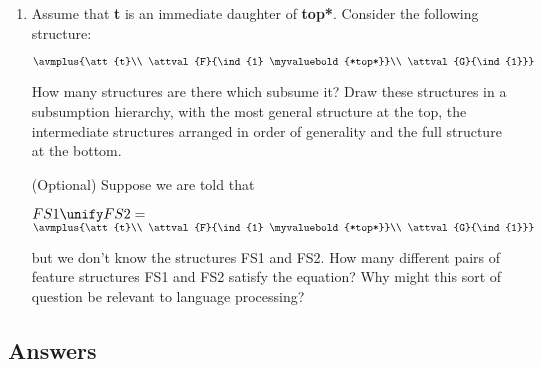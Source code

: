 \documentclass[12pt]{report}
\begin{document}
\begin{enumerate}
\item
Assume that {\bf t} is an immediate daughter of {\bf *top*}.
Consider the following structure:
\begin{center}
{\tiny $\avmplus{\att{t}\\
             \attval{F}{\ind{1} \myvaluebold{*top*}}\\
             \attval{G}{\ind{1}}}$}
\end{center}
How many structures are there which subsume it?
Draw these structures in a subsumption hierarchy, with the most general
structure at the top, the intermediate structures arranged 
in order of generality and the full structure at the bottom.

(Optional) Suppose we are told that 
\begin{center}
$FS1 \unify FS2 =$ {\tiny $\avmplus{\att{t}\\
             \attval{F}{\ind{1} \myvaluebold{*top*}}\\
             \attval{G}{\ind{1}}}$}
\end{center}
but we don't know the structures FS1 and FS2.  
How many different pairs of feature structures FS1 and FS2
satisfy the equation?
Why might this sort of question be relevant to language processing?
\end{enumerate}

\subsection{Answers}
\end{document}
